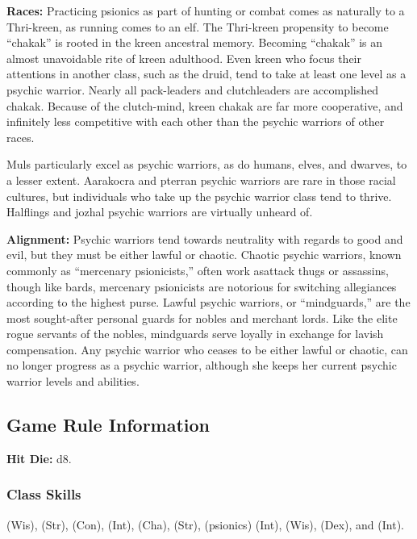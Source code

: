 \textbf{Races:} Practicing psionics as part of hunting or combat comes as naturally to a Thri-kreen, as running comes to an elf. The Thri-kreen propensity to become ``chakak'' is rooted in the kreen ancestral memory. Becoming ``chakak'' is an almost unavoidable rite of kreen adulthood. Even kreen who focus their attentions in another class, such as the druid, tend to take at least one level as a psychic warrior. Nearly all pack-leaders and clutchleaders are accomplished chakak. Because of the clutch-mind, kreen chakak are far more cooperative, and infinitely less competitive with each other than the psychic warriors of other races.

Muls particularly excel as psychic warriors, as do humans, elves, and dwarves, to a lesser extent. Aarakocra and pterran psychic warriors are rare in those racial cultures, but individuals who take up the psychic warrior class tend to thrive. Halflings and jozhal psychic warriors are virtually unheard of.

\textbf{Alignment:} Psychic warriors tend towards neutrality with regards to good and evil, but they must be either lawful or chaotic. Chaotic psychic warriors, known commonly as ``mercenary psionicists,'' often work asattack thugs or assassins, though like bards, mercenary psionicists are notorious for switching allegiances according to the highest purse. Lawful psychic warriors, or ``mindguards,'' are the most sought-after personal guards for nobles and merchant lords. Like the elite rogue servants of the nobles, mindguards serve loyally in exchange for lavish compensation. Any psychic warrior who ceases to be either lawful or chaotic, can no longer progress as a psychic warrior, although she keeps her current psychic warrior levels and abilities.

\subsection{Game Rule Information}

\textbf{Hit Die:} d8.

\subsubsection{Class Skills}
 (Wis),  (Str),  (Con),  (Int),  (Cha),  (Str),  (psionics) (Int),  (Wis),  (Dex), and  (Int).

